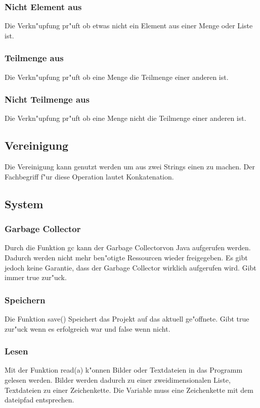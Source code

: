 \documentclass{scrartcl}
\begin{document}
\subsubsection{Nicht Element aus}
\label{chp:Nicht_Element_aus}
Die Verkn"upfung  pr"uft ob etwas nicht ein Element aus einer Menge oder Liste ist.
\subsubsection{Teilmenge aus}
\label{chp:Teilmenge_aus}
Die Verkn"upfung  pr"uft ob eine Menge die Teilmenge einer anderen ist.
\subsubsection{Nicht Teilmenge aus}
\label{chp:Nicht_Teilmenge_aus}
Die Verkn"upfung  pr"uft ob eine Menge nicht die Teilmenge einer anderen ist.
\subsection{Vereinigung}
\label{Vereinigung}
Die Vereinigung kann genutzt werden um aus zwei Strings einen zu machen. Der Fachbegriff f"ur diese Operation lautet Konkatenation.
\subsection{System}
\subsubsection{Garbage Collector}
Durch die Funktion gc kann der \glqq Garbage Collector\grqq  von Java aufgerufen werden. Dadurch werden nicht mehr ben"otigte Ressourcen wieder freigegeben. Es gibt jedoch keine Garantie, dass der Garbage Collector wirklich aufgerufen wird. Gibt immer true zur"uck.
\subsubsection{Speichern}
Die Funktion save() Speichert das Projekt auf das aktuell ge"offnete. Gibt true zur"uck wenn es erfolgreich war und false wenn nicht.
\subsubsection{Lesen}
Mit der Funktion read(a) k"onnen Bilder oder Textdateien in das Programm gelesen werden. Bilder werden dadurch zu einer zweidimensionalen Liste, Textdateien zu einer Zeichenkette. Die Variable muss eine Zeichenkette mit dem dateipfad entsprechen.
\end{document}
